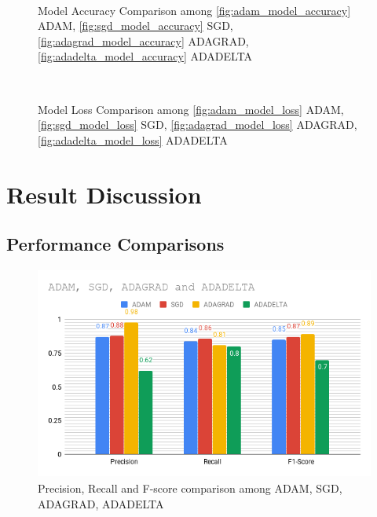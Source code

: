 \documentclass{report}
\begin{document}
\begin{figure}[htbp]
\centering
    \\
  \label{fig:model accuracy}
  \caption{Model Accuracy Comparison among \ref{fig:adam_model_accuracy} ADAM, \ref{fig:sgd_model_accuracy} SGD, \ref{fig:adagrad_model_accuracy} ADAGRAD, \ref{fig:adadelta_model_accuracy} ADADELTA}
\end{figure}

\begin{figure}[htbp]
\centering
    \\
  \label{model loss}
  \caption{Model Loss Comparison among \ref{fig:adam_model_loss} ADAM, \ref{fig:sgd_model_loss} SGD, \ref{fig:adagrad_model_loss} ADAGRAD, \ref{fig:adadelta_model_loss} ADADELTA}
\end{figure}


\chapter{Result Discussion}
\section{Performance Comparisons}

\begin{figure}[htbp]
\centering
\includegraphics[height=7cm]{Pictures/ADAM_SGD_ADAGRAD_and_ADADELTA_graph.png}
\caption{Precision, Recall and F-score comparison among ADAM, SGD, ADAGRAD, ADADELTA}
\label{}
\end{figure}
\end{document}
